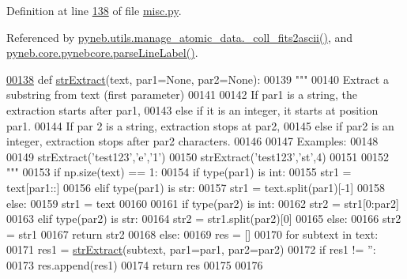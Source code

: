 Definition at line \hyperlink{misc_8py_source_l00138}{138} of file \hyperlink{misc_8py_source}{misc.\+py}.



Referenced by \hyperlink{manage__atomic__data_8py_source_l00670}{pyneb.\+utils.\+manage\+\_\+atomic\+\_\+data.\+\_\+coll\+\_\+fits2ascii()}, and \hyperlink{pynebcore_8py_source_l03167}{pyneb.\+core.\+pynebcore.\+parse\+Line\+Label()}.


\begin{DoxyCode}
\hypertarget{namespacepyneb_1_1utils_1_1misc_l00138}{}\hyperlink{namespacepyneb_1_1utils_1_1misc_aaf9c5249e3c3104e38854ca30f9df4b7}{00138} \textcolor{keyword}{def }\hyperlink{namespacepyneb_1_1utils_1_1misc_aaf9c5249e3c3104e38854ca30f9df4b7}{strExtract}(text, par1=None, par2=None): 
00139     \textcolor{stringliteral}{"""}
00140 \textcolor{stringliteral}{    Extract a substring from text (first parameter)}
00141 \textcolor{stringliteral}{     }
00142 \textcolor{stringliteral}{    If par1 is a string, the extraction starts after par1,}
00143 \textcolor{stringliteral}{    else if it is an integer, it starts at position par1.}
00144 \textcolor{stringliteral}{    If par 2 is a string, extraction stops at par2, }
00145 \textcolor{stringliteral}{    else if par2 is an integer, extraction stops after par2 characters.}
00146 \textcolor{stringliteral}{    }
00147 \textcolor{stringliteral}{    Examples: }
00148 \textcolor{stringliteral}{    }
00149 \textcolor{stringliteral}{    strExtract('test123','e','1')}
00150 \textcolor{stringliteral}{    strExtract('test123','st',4)}
00151 \textcolor{stringliteral}{    }
00152 \textcolor{stringliteral}{    """}
00153     \textcolor{keywordflow}{if} np.size(text) == 1:
00154         \textcolor{keywordflow}{if} type(par1) \textcolor{keywordflow}{is} int:
00155             str1 = text[par1::]
00156         \textcolor{keywordflow}{elif} type(par1) \textcolor{keywordflow}{is} str:
00157             str1 = text.split(par1)[-1]
00158         \textcolor{keywordflow}{else}:
00159             str1 = text
00160     
00161         \textcolor{keywordflow}{if} type(par2) \textcolor{keywordflow}{is} int:
00162             str2 = str1[0:par2]
00163         \textcolor{keywordflow}{elif} type(par2) \textcolor{keywordflow}{is} str:
00164             str2 = str1.split(par2)[0]
00165         \textcolor{keywordflow}{else}:
00166             str2 = str1
00167         \textcolor{keywordflow}{return} str2
00168     \textcolor{keywordflow}{else}:
00169         res = []
00170         \textcolor{keywordflow}{for} subtext \textcolor{keywordflow}{in} text:
00171             res1 = \hyperlink{namespacepyneb_1_1utils_1_1misc_aaf9c5249e3c3104e38854ca30f9df4b7}{strExtract}(subtext, par1=par1, par2=par2)
00172             \textcolor{keywordflow}{if} res1 != \textcolor{stringliteral}{''}:
00173                 res.append(res1)
00174         \textcolor{keywordflow}{return} res
00175 
00176 
\end{DoxyCode}
